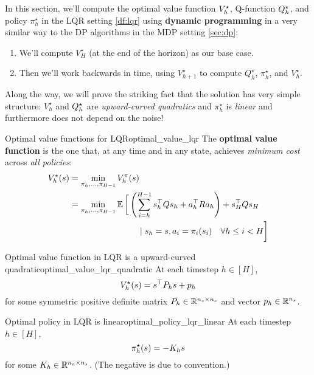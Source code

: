 \documentclass[\main/main]{subfiles}
\begin{document}
In this section, we'll compute the optimal value function $V^\star_h$, Q-function $Q^\star_h$, and policy $\pi^\star_h$ in the LQR setting \eqref{df:lqr} using \textbf{dynamic programming} in a very similar way to the DP algorithms in the MDP setting \eqref{sec:dp}:
\begin{enumerate}
    \item We'll compute $V_H^\star$ (at the end of the horizon) as our base case.
    \item Then we'll work backwards in time, using $V_{h+1}^\star$ to compute $Q_h^\star$, $\pi_{h}^\star$, and $V_h^\star$.
\end{enumerate}
Along the way, we will prove the striking fact that the solution has very simple structure: $V_h^\star$ and $Q^\star_h$ are \emph{upward-curved quadratics} and $\pi_h^\star$ is \emph{linear} and furthermore does not depend on the noise!

\begin{definition}[breakable=false]{Optimal value functions for LQR}{optimal_value_lqr}
    The \textbf{optimal value function} is the one that, at any time and in any state,
    achieves \emph{minimum cost} across \emph{all policies}: \[
        \begin{split}
            V^\star_h(s) &= \min_{\pi_h, \dots, \pi_{H-1}} V^\pi_h(s) \\
            &= \min_{\pi_{h}, \dots, \pi_{H-1}} \operatorname*{\mathbb{E}} \bigg[ \left( \sum_{i=h}^{H-1} s_h^\top Q s_h + a_h^\top R a_h \right) + s_H^\top Q s_H \\
                &\hspace{8em} \mid s_h = s, a_i = \pi_i(s_i) \quad \forall h \le i < H \bigg] \\
        \end{split}
    \]
\end{definition}

\begin{theorem}{Optimal value function in LQR is a upward-curved quadratic}{optimal_value_lqr_quadratic}
    At each timestep $h \in [H]$,
    \[
        V^\star_h(s) = s^\top P_h s + p_h
    \]
    for some symmetric positive definite matrix $P_h \in \mathbb{R}^{n_s \times n_s}$ and vector $p_h \in \mathbb{R}^{n_s}$.
\end{theorem}

\begin{theorem}{Optimal policy in LQR is linear}{optimal_policy_lqr_linear}
    At each timestep $h \in [H]$,
    \[
        \pi^\star_h (s) = - K_h s
    \]
    for some $K_h \in \mathbb{R}^{n_a \times n_s}$. (The negative is due to convention.)
\end{theorem}
\end{document}
